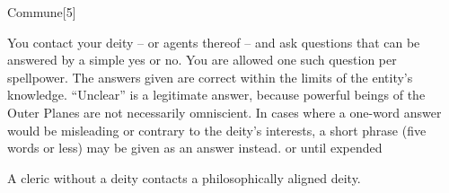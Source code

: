 \begin{spellsection}{Commune}[5]
    \begin{spellheader}
    \end{spellheader}
    \begin{spellcontent}
        \begin{spelltargetinginfo}
        \end{spelltargetinginfo}
        \begin{spelleffects}

            \spellline
            \spelleffect You contact your deity -- or agents thereof -- and ask questions that can be answered by a simple yes or no. You are allowed one such question per spellpower. The answers given are correct within the limits of the entity's knowledge. ``Unclear'' is a legitimate answer, because powerful beings of the Outer Planes are not necessarily omniscient. In cases where a one-word answer would be misleading or contrary to the deity's interests, a short phrase (five words or less) may be given as an answer instead.
            \spelldur \durmed or until expended
        \end{spelleffects}
    \end{spellcontent}
    \begin{spellfooter}
        \spellnotes A cleric without a deity contacts a philosophically aligned deity.
    \end{spellfooter}
\end{spellsection}

